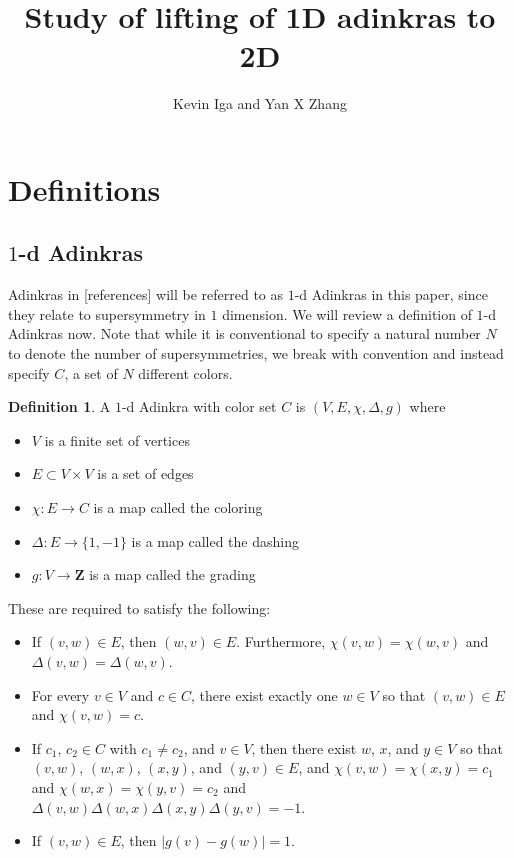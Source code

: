 \documentclass[12pt,twoside,singlespace]{article}
\title{Study of lifting of 1D adinkras to 2D}
\author{Kevin Iga and Yan X Zhang}
\numberwithin{equation}{section}
\theoremstyle{definition}
\newtheorem{definition}[equation]{Definition}
\newcommand{\ZZ}{\mathbf{Z}}
\begin{document}
\pagestyle{plain}

\maketitle

\section{Definitions}

\subsection{$1$-d Adinkras}
Adinkras in [references] will be referred to as $1$-d Adinkras in this paper, since they relate to supersymmetry in $1$ dimension.  We will review a definition of $1$-d Adinkras now.  Note that while it is conventional to specify a natural number $N$ to denote the number of supersymmetries, we break with convention and instead specify $C$, a set of $N$ different colors.

\begin{definition}
A $1$-d Adinkra with color set $C$ is $(V,E,\chi,\Delta,g)$ where
\begin{itemize}
\item $V$ is a finite set of vertices
\item $E\subset V\times V$ is a set of edges
\item $\chi:E\to C$ is a map called the coloring
\item $\Delta:E\to \{1,-1\}$ is a map called the dashing
\item $g:V\to\ZZ$ is a map called the grading
\end{itemize}

These are required to satisfy the following:
\begin{itemize}
\item If $(v,w)\in E$, then $(w,v)\in E$.  Furthermore, $\chi(v,w)=\chi(w,v)$ and $\Delta(v,w)=\Delta(w,v)$.
\item For every $v\in V$ and $c\in C$, there exist exactly one $w\in V$ so that $(v,w)\in E$ and $\chi(v,w)=c$.
\item If $c_1$, $c_2\in C$ with $c_1\not=c_2$, and $v\in V$, then there exist $w$, $x$, and $y\in V$ so that $(v,w)$, $(w,x)$, $(x,y)$, and $(y,v)\in E$, and $\chi(v,w)=\chi(x,y)=c_1$ and $\chi(w,x)=\chi(y,v)=c_2$ and $\Delta(v,w)\Delta(w,x)\Delta(x,y)\Delta(y,v)=-1$.
\item If $(v,w)\in E$, then $|g(v)-g(w)|=1$.
\end{itemize}
\end{definition}
\end{document}
